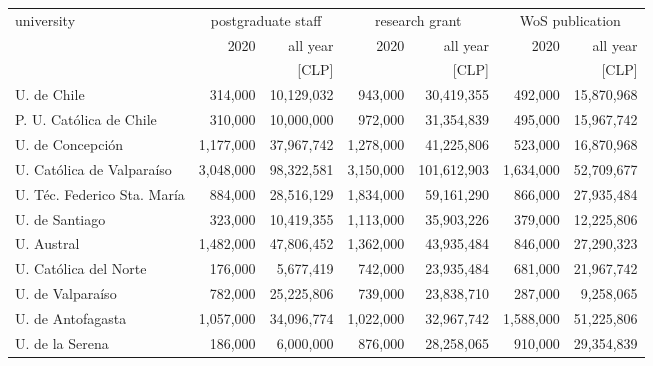 \begin{tabular}{l rr rr rr}
\hline\hline
university                     & 
                          \multicolumn{2}{c}{postgraduate staff} & 
                                                                \multicolumn{2}{c}{research grant} & 
                                                                                                 \multicolumn{2}{c}{WoS publication} \\
                               &          2020 & all year        &          2020 & all year        &          2020 & all year        \\
                               &               & [CLP]           &               & [CLP]           &               & [CLP]           \\
\hline
U. de Chile                    &       314,000 &      10,129,032 &       943,000 &      30,419,355 &       492,000 &      15,870,968 \\
P. U. Católica de Chile        &       310,000 &      10,000,000 &       972,000 &      31,354,839 &       495,000 &      15,967,742 \\
U. de Concepción               &     1,177,000 &      37,967,742 &     1,278,000 &      41,225,806 &       523,000 &      16,870,968 \\
U. Católica de Valparaíso      &     3,048,000 &      98,322,581 &     3,150,000 &     101,612,903 &     1,634,000 &      52,709,677 \\
U. Téc. Federico Sta. María    &       884,000 &      28,516,129 &     1,834,000 &      59,161,290 &       866,000 &      27,935,484 \\
U. de Santiago                 &       323,000 &      10,419,355 &     1,113,000 &      35,903,226 &       379,000 &      12,225,806 \\
U. Austral                     &     1,482,000 &      47,806,452 &     1,362,000 &      43,935,484 &       846,000 &      27,290,323 \\
U. Católica del Norte          &       176,000 &       5,677,419 &       742,000 &      23,935,484 &       681,000 &      21,967,742 \\
U. de Valparaíso               &       782,000 &      25,225,806 &       739,000 &      23,838,710 &       287,000 &       9,258,065 \\
U. de Antofagasta              &     1,057,000 &      34,096,774 &     1,022,000 &      32,967,742 &     1,588,000 &      51,225,806 \\
U. de la Serena                &       186,000 &       6,000,000 &       876,000 &      28,258,065 &       910,000 &      29,354,839 \\

\end{tabular}
